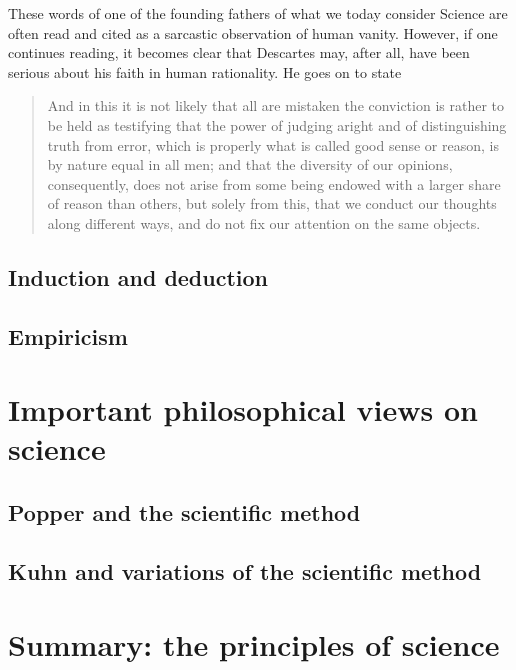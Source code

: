\documentclass{tufte-book}
\begin{document}
These words of one of the founding fathers of what we today consider Science are often read and cited as a sarcastic observation of human vanity. However, if one continues reading, it becomes clear that Descartes may, after all, have been serious about his faith in human rationality. He goes on to state

\begin{quote}
And in this it is not likely that all are mistaken the conviction is rather to be held as testifying that the power of judging aright and of distinguishing truth from error, which is properly what is called good sense or reason, is by nature equal in all men; and that the diversity of our opinions, consequently, does not arise from some being endowed with a larger share of reason than others, but solely from this, that we conduct our thoughts along different ways, and do not fix our attention on the same objects. 
\end{quote}



\subsection{Induction and deduction}

\subsection{Empiricism}


\section{Important philosophical views on science}


\subsection{Popper and the scientific method}


\subsection{Kuhn and variations of the scientific method}


\subsection{}


\section{Summary: the principles of science}
\end{document}
